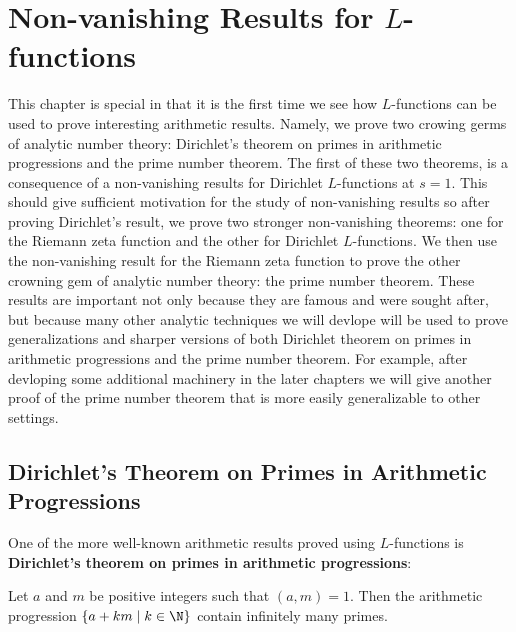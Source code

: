 \chapter{Non-vanishing Results for \texorpdfstring{$L$}{L}-functions}\label{ch:Selected_topics_in_L-functions}
  This chapter is special in that it is the first time we see how $L$-functions can be used to prove interesting arithmetic results. Namely, we prove two crowing germs of analytic number theory: Dirichlet's theorem on primes in arithmetic progressions and the prime number theorem. The first of these two theorems, is a consequence of a non-vanishing results for Dirichlet $L$-functions at $s = 1$. This should give sufficient motivation for the study of non-vanishing results so after proving Dirichlet's result, we prove two stronger non-vanishing theorems: one for the Riemann zeta function and the other for Dirichlet $L$-functions. We then use the non-vanishing result for the Riemann zeta function to prove the other crowning gem of analytic number theory: the prime number theorem. These results are important not only because they are famous and were sought after, but because many other analytic techniques we will devlope will be used to prove generalizations and sharper versions of both Dirichlet theorem on primes in arithmetic progressions and the prime number theorem. For example, after devloping some additional machinery in the later chapters we will give another proof of the prime number theorem that is more easily generalizable to other settings.
    \section{Dirichlet's Theorem on Primes in Arithmetic Progressions}
      One of the more well-known arithmetic results proved using $L$-functions is \textbf{Dirichlet's theorem on primes in arithmetic progressions}:

      \begin{theorem}\label{thm:Dirichlet's_theorem_on_primes_in_arithmetic_progressions}
        Let $a$ and $m$ be positive integers such that $(a,m) = 1$. Then the arithmetic progression $\{a+km \mid k \in \N\}$ contain infinitely many primes.
      \end{theorem}

